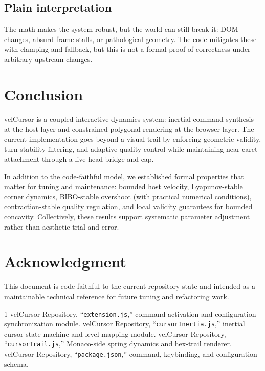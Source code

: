 \documentclass[journal]{IEEEtran}
\begin{document}
\subsection{Plain interpretation}
The math makes the system robust, but the world can still break it: DOM changes, absurd frame stalls, or pathological geometry. The code mitigates these with clamping and fallback, but this is not a formal proof of correctness under arbitrary upstream changes.

\section{Conclusion}

velCursor is a coupled interactive dynamics system: inertial command synthesis at the host layer and constrained polygonal rendering at the browser layer. The current implementation goes beyond a visual trail by enforcing geometric validity, turn-stability filtering, and adaptive quality control while maintaining near-caret attachment through a live head bridge and cap.

In addition to the code-faithful model, we established formal properties that matter for tuning and maintenance:
bounded host velocity, Lyapunov-stable corner dynamics, BIBO-stable overshoot (with practical numerical conditions), contraction-stable quality regulation, and local validity guarantees for bounded concavity. Collectively, these results support systematic parameter adjustment rather than aesthetic trial-and-error.

\section*{Acknowledgment}
This document is code-faithful to the current repository state and intended as a maintainable technical reference for future tuning and refactoring work.

\begin{thebibliography}{1}
velCursor Repository, ``\texttt{extension.js},'' command activation and configuration synchronization module.
velCursor Repository, ``\texttt{cursorInertia.js},'' inertial cursor state machine and level mapping module.
velCursor Repository, ``\texttt{cursorTrail.js},'' Monaco-side spring dynamics and hex-trail renderer.
velCursor Repository, ``\texttt{package.json},'' command, keybinding, and configuration schema.
\end{thebibliography}
\end{document}
